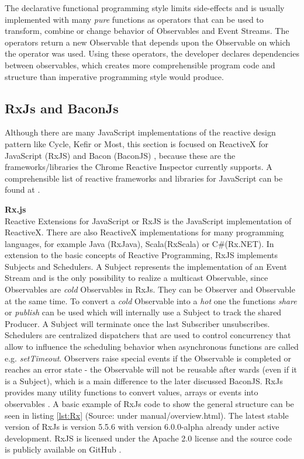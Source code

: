 	The declarative functional programming style limits side-effects and is usually implemented with many \emph{pure} functions as operators that can be used to transform, combine or change behavior of Observables and Event Streams. The operators return a new Observable that depends upon the Observable on which the operator was used. Using these operators, the developer declares dependencies between observables, which creates more comprehensible program code and structure \cite[Why Reactive Programming?]{ReactiveInspector} than imperative programming style would produce. 
	

	\subsection{RxJs and BaconJs}
	Although there are many JavaScript implementations of the reactive design pattern like Cycle\cite{CycleJS}, Kefir\cite{KefirJS} or  Most\cite{MostJS}, this section is focused on ReactiveX for JavaScript (RxJS) \cite{RxJs} and Bacon (BaconJS) \cite{BaconJS}, because these are the frameworks/libraries the Chrome Reactive Inspector currently supports. A comprehensible list of reactive frameworks and libraries for JavaScript can be found at \cite{FRPJSList}.
	
	\textbf{Rx.js}\\
	Reactive Extensions for JavaScript or RxJS is the JavaScript implementation of ReactiveX. There are also ReactiveX implementations for many programming languages, for example Java (RxJava), Scala(RxScala) or C\#(Rx.NET). In extension to the basic concepts of Reactive Programming, RxJS implements Subjects and Schedulers. A Subject represents the implementation of an Event Stream and is the only possibility to realize a multicast Observable, since Observables are \emph{cold} Observables in RxJs. They can be Observer and Observable at the same time. To convert a \emph{cold} Observable into a \emph{hot} one the functions \emph{share} or \emph{publish} can be used which will internally use a Subject to track the shared Producer. A Subject will terminate once the last Subscriber unsubscribes. Schedulers are centralized dispatchers that are used to control concurrency that allow to influence the scheduling behavior when asynchronous functions are called e.g. \emph{setTimeout}\cite{RxJsDocu}.
	Observers raise special events if the Observable is completed or reaches an error state - the Observable will not be reusable after wards (even if it is a Subject), which is a main difference to the later discussed BaconJS. RxJs provides many utility functions to convert values, arrays or events into observables \cite{ThesisBaradur}. A basic example of RxJs code to show the general structure can be seen in listing \ref{lst:Rx} (Source: \cite{RxJsDocu} under manual/overview.html).
	The latest stable version of RxJs is version 5.5.6 with version 6.0.0-alpha already under active development. RxJS is licensed under the Apache 2.0 license and the source code is publicly available on GitHub \cite{RxJs}.

